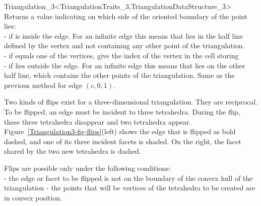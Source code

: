\begin{ccRefClass}{Triangulation_3<TriangulationTraits_3,TriangulationDataStructure_3>}
{Returns a value indicating on which side of the oriented boundary
of  the point  lies:\\
-  if  is inside the edge. For an
infinite edge this means that  lies in the half line defined by
the vertex and not containing any other point of the triangulation.\\ 
-  if  equals one of the vertices,
 give the index of the vertex in the cell storing \\
-  if  lies outside the edge. For
an infinite edge this means that  lies on the other half line,
which contains the other points of the triangulation.
}
\ccGlue
{}
{Same as the previous method for edge $(c,0,1)$.}


Two kinds of flips exist for a three-dimensional triangulation. They
are reciprocal. To be flipped, an edge must be incident to three
tetrahedra. During the flip, these three tetrahedra disappear and two
tetrahedra appear. Figure~\ref{Triangulation3-fig-flips}(left) shows the
edge that is flipped as bold dashed, and one of its three incident
facets is shaded. On the right, the facet shared by the two new
tetrahedra is dashed. 

Flips are possible only under the following conditions:\\
- the edge or facet to be flipped is not on the boundary of the convex
hull of the triangulation 
- the points that will be vertices of the tetrahedra to be created are 
in convex position.


\end{ccRefClass}
